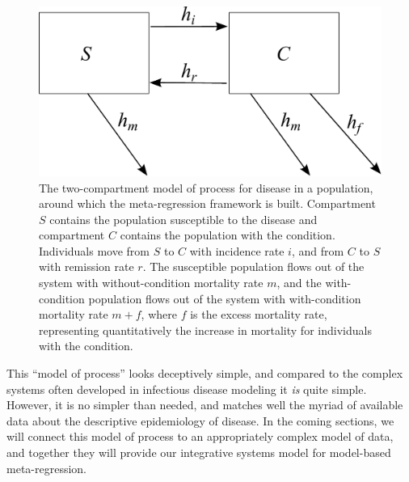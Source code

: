 \begin{figure}[h]
\begin{center}
\includegraphics[width=5in]{SC.pdf}
\caption{The two-compartment model of process for disease in a
  population, around which the meta-regression framework is
  built. Compartment $S$ contains the population susceptible to the
  disease and compartment $C$ contains the population with the
  condition. Individuals move from $S$ to $C$ with incidence rate $i$,
  and from $C$ to $S$ with remission rate $r$. The susceptible
  population flows out of the system with without-condition mortality
  rate $m$, and the with-condition population flows out of the system
  with with-condition mortality rate $m+f$, where $f$ is the excess
  mortality rate, representing quantitatively the increase in
  mortality for individuals with the condition.}
\label{forward-sim-two-compartment}
\end{center}
\end{figure}


This ``model of process'' looks deceptively simple, and compared to
the complex systems often developed in infectious disease modeling it
\emph{is} quite simple.  However, it is no simpler than needed, and
matches well the myriad of available data about the descriptive
epidemiology of disease.  In the coming sections, we will connect this
model of process to an appropriately complex model of data, and
together they will provide our integrative systems model for
model-based meta-regression.

